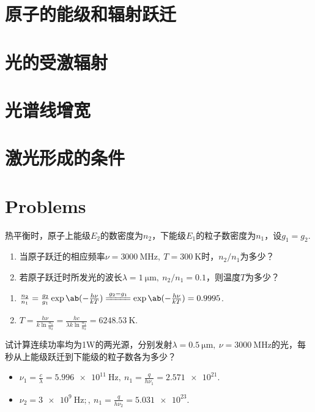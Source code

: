 \section{原子的能级和辐射跃迁}
\section{光的受激辐射}
\section{光谱线增宽}
\section{激光形成的条件}
\newpage
\section*{Problems}
\begin{problem}
	热平衡时，原子上能级$E_2$的数密度为$n_2$，下能级$E_1$的粒子数密度为$n_1$，设$g_1=g_2$.
\begin{enumerate}
	\item 当原子跃迁的相应频率$\nu=\qty{3000}{\MHz},\ T=\qty{300}{\K}$时，$n_2/n_1$为多少？
	\item 若原子跃迁时所发光的波长$\lambda=\qty{1}{\um},\ n_2/n_1=0.1$，则温度$T$为多少？
\end{enumerate}
\end{problem}
\begin{solution}
\begin{enumerate}
	\item $\frac{n_2}{n_1}=\frac{g_2}{g_1}\exp\ab(-\frac{h\nu}{kT})\xlongequal{g_2=g_1}\exp\ab(-\frac{h\nu}{kT})=0.9995$.
	\item $T=\frac{h\nu}{k\ln\frac{n_1}{n_2}}=\frac{hc}{\lambda k\ln\frac{n_1}{n_2}}=\qty{6248.53}{\K}$.
\end{enumerate}
\end{solution}

\begin{problem}
	试计算连续功率均为1W的两光源，分别发射$\lambda=\qty{0.5}{\um},\ \nu=\qty{3000}{\MHz}$的光，每秒从上能级跃迁到下能级的粒子数各为多少？
\end{problem}
\begin{solution}
\begin{itemize}
	\item $\nu_1=\frac{c}{\lambda}=\qty{5.996e11}{\Hz},\ n_1=\frac{q}{h\nu_1}=\num{2.571e21}$.
	\item $\nu_2=\qty{3e9}{\Hz};,\ n_1=\frac{q}{h\nu_2}=\num{5.031e23}$.
\end{itemize}
\end{solution}

